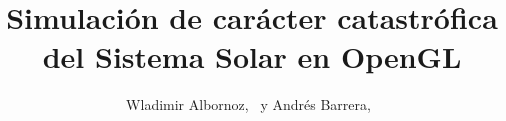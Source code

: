 \documentclass[12pt,journal,compsoc]{IEEEtran}
\begin{document}
%
\title{Simulación de carácter catastrófica del Sistema Solar en OpenGL}
%
%
%
%

\author{Wladimir Albornoz,~ y Andrés Barrera,~}%



% 
%
\end{document}
